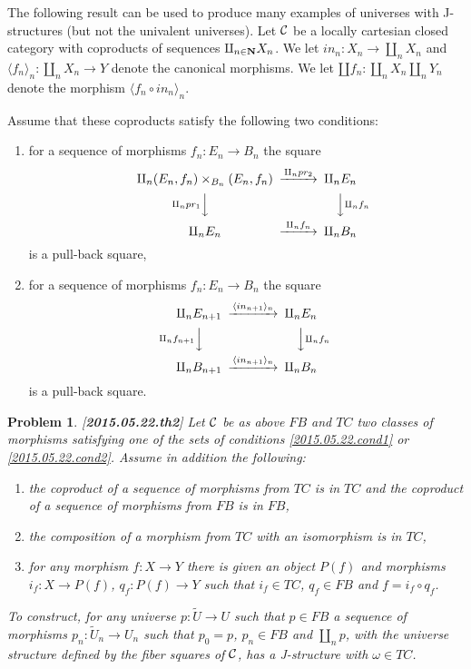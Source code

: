 \documentclass[12pt]{article}
\newtheorem{problem}[proposition]{Problem}
\newcommand{\llabel}[1]{\label{#1}[{\bf #1}]}
\newcommand{\sr}{\rightarrow}
\newcommand{\nn}{{\bf N\rm}}
\newcommand{\wt}{\widetilde}
\begin{document}
The following result can be used to produce many examples of universes with J-structures (but not the univalent universes). Let $\cal C$ be a locally cartesian closed category with coproducts of sequences $\amalg_{n\in\nn}X_n$. We let $in_n:X_n\sr \amalg_n X_n$ and $\langle f_n \rangle_{n} : \amalg_n X_n\sr Y$ denote the canonical morphisms. We let $\amalg f_n : \amalg_n X_n \amalg_n Y_n$ denote the morphism $\langle f_n\circ in_n \rangle_{n}$. 

Assume that these coproducts satisfy the following two conditions:
%
\begin{enumerate}
\item for a sequence of morphisms $f_n:E_n\sr B_n$ the square
%
$$
\begin{CD}
\amalg_n (E_n,f_n)\times_{B_n}(E_n,f_n) @>\amalg_n pr_2>> \amalg_n E_n\\
@V \amalg_n pr_1 VV @VV \amalg_n f_n V\\
\amalg_n E_n @>\amalg_n f_n >> \amalg_n B_n
\end{CD}
$$
%
is a pull-back square,
%
\item for a sequence of morphisms $f_n:E_n\sr B_n$ the square
%
$$
\begin{CD}
\amalg_n E_{n+1} @> \langle in_{n+1} \rangle_{n} >> \amalg_n E_n\\
@V\amalg_n f_{n+1} VV @VV \amalg_n f_n V\\
\amalg_n B_{n+1} @> \langle in_{n+1} \rangle_{n} >> \amalg_n B_n
\end{CD}
$$
%
is a pull-back square. 
\end{enumerate}
%
%
\begin{problem}
\llabel{2015.05.22.th2}
Let $\cal C$ be as above $FB$ and $TC$ two classes of morphisms satisfying one of the sets of conditions \ref{2015.05.22.cond1} or \ref{2015.05.22.cond2}. Assume in addition the following:
%
\begin{enumerate}
\item the coproduct of a sequence of morphisms from $TC$ is in $TC$ and the coproduct of a sequence of morphisms from $FB$ is in $FB$,
\item the composition of a morphism from $TC$ with an isomorphism is in $TC$,
\item  for any morphism $f: X \sr Y$ there is given an object $P(f)$ and morphisms $i_f:X\sr P(f)$, $q_f:P(f)\sr Y$ such that $i_f\in TC$, $q_f\in FB$ and $f=i_f\circ q_f$.
\end{enumerate}
%
To construct, for any universe $p: \wt{U}\sr U$ such that $p\in FB$ a sequence of morphisms $p_n:\wt{U}_n\sr U_n$ such that $p_0=p$, $p_n\in FB$ and $\amalg_n p$, with the universe structure defined by the fiber squares of $\cal C$, has a J-structure with $\omega\in TC$.
\end{problem}
\end{document}
